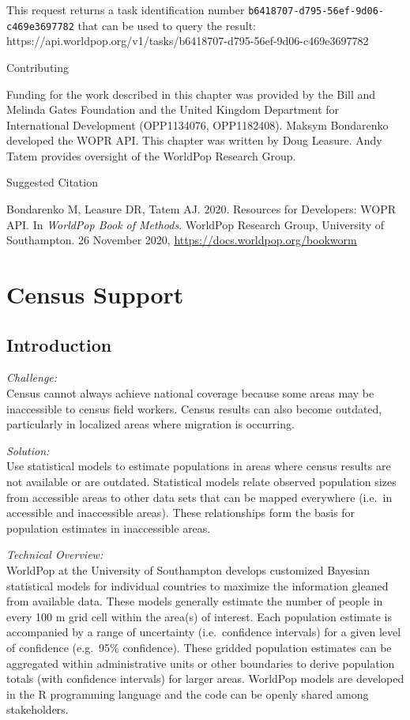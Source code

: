 \documentclass[]{book}
\begin{document}
This request returns a task identification number
\texttt{b6418707-d795-56ef-9d06-c469e3697782} that can be used to query
the result:\\
https://api.worldpop.org/v1/tasks/b6418707-d795-56ef-9d06-c469e3697782

Contributing

Funding for the work described in this chapter was provided by the Bill
and Melinda Gates Foundation and the United Kingdom Department for
International Development (OPP1134076, OPP1182408). Maksym Bondarenko
developed the WOPR API. This chapter was written by Doug Leasure. Andy
Tatem provides oversight of the WorldPop Research Group.

Suggested Citation

Bondarenko M, Leasure DR, Tatem AJ. 2020. Resources for Developers: WOPR
API. In \emph{WorldPop Book of Methods}. WorldPop Research Group,
University of Southampton. 26 November 2020,
\url{https://docs.worldpop.org/bookworm}

\appendix


\chapter{Census Support}\label{census-support}

\section{Introduction}\label{introduction-6}

\emph{Challenge:}\\
Census cannot always achieve national coverage because some areas may be
inaccessible to census field workers. Census results can also become
outdated, particularly in localized areas where migration is occurring.

\emph{Solution:}\\
Use statistical models to estimate populations in areas where census
results are not available or are outdated. Statistical models relate
observed population sizes from accessible areas to other data sets that
can be mapped everywhere (i.e.~in accessible and inaccessible areas).
These relationships form the basis for population estimates in
inaccessible areas.

\emph{Technical Overview:}\\
WorldPop at the University of Southampton develops customized Bayesian
statistical models for individual countries to maximize the information
gleaned from available data. These models generally estimate the number
of people in every 100 m grid cell within the area(s) of interest. Each
population estimate is accompanied by a range of uncertainty
(i.e.~confidence intervals) for a given level of confidence (e.g.~95\%
confidence). These gridded population estimates can be aggregated within
administrative units or other boundaries to derive population totals
(with confidence intervals) for larger areas. WorldPop models are
developed in the R programming language and the code can be openly
shared among stakeholders.
\end{document}
